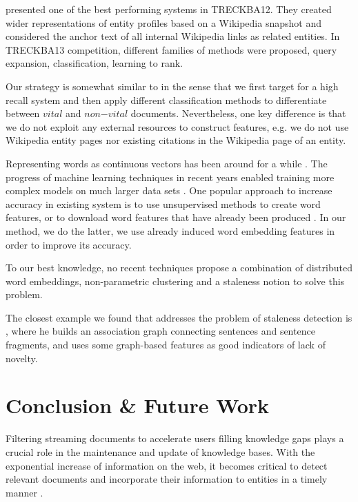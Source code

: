 \documentclass{article}
\begin{document}
\citet{xitong12} presented one of the best performing systems in TRECKBA12. They created wider representations of entity profiles based on a Wikipedia snapshot and considered the anchor text of all internal Wikipedia links as related entities. In TRECKBA13 competition, different families of methods were proposed, query expansion, classification, learning to rank. 

Our strategy is somewhat similar to \citet{jingang13} in the sense that we first target for a high recall system and then apply different classification methods to differentiate between $vital$ and $non\mathord{-}vital$ documents. Nevertheless, one key difference is that we do not exploit any external resources to construct features, e.g. we do not use Wikipedia entity pages nor existing citations in the Wikipedia page of an entity. 

Representing words as continuous vectors has been around for a while \cite{Hinton87, Elman90findingstructure}. The progress of machine learning techniques in recent years enabled training more complex models on much larger data sets \cite{mikolovChen}. One popular approach to increase accuracy in existing system is to use unsupervised methods to create word features, or to download word features that have already been produced \cite{Turian10wordrepresentations}. In our method, we do the latter, we use already induced word embedding features in order to improve its accuracy.

To our best knowledge, no recent techniques propose a combination of distributed word embeddings, non-parametric clustering and a staleness notion to solve this problem. 

The closest example we found that addresses the problem of staleness detection is \cite{gamon}, where he builds an association graph connecting sentences and sentence fragments, and uses some graph-based features as good indicators of lack of novelty.

\section{Conclusion \& Future Work}
\label{conclusion}

Filtering streaming documents to accelerate users filling knowledge gaps plays a crucial role in the maintenance and update of knowledge bases.
With the exponential increase of information on the web, it becomes critical to detect relevant documents and incorporate their information to entities in a timely manner \cite{jingang13}.
\end{document}
